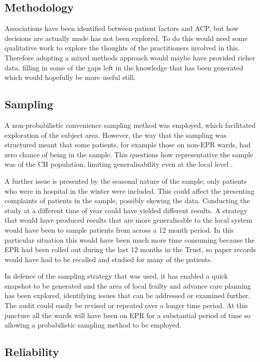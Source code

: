 \documentclass
[
	12pt,
	a4paper,
	oneside,
]{report}
\begin{document}
\subsection{Methodology}

Associations have been identified between patient factors and ACP, but
how decisions are actually made has not been explored. To do this would need 
some qualitative work to explore the thoughts of the practitioners involved
in this. Therefore adopting a mixed methods approach 
would maybe have provided richer data, filling in some of the gaps left in the
knowledge that has been generated which would hopefully be more useful still.

\subsection{Sampling}
A non-probabilistic convenience sampling method was employed, which facilitated 
exploration of the subject area. However, the way that the sampling was 
structured meant that some patients, for example those on non-EPR wards, had
zero chance of being in the sample. This questions how representative the sample
was of the CH population, limiting generalisability even at the local level 
\parencite{biggam:15}.

A further issue is presented by the seasonal 
nature of the sample; only patients who were in hospital in the winter were 
included. This could affect the presenting complaints of patients in the sample,
possibly skewing the data.
Conducting the study at a different time of year could have yielded different 
results. A strategy that would have produced results that are more generalisable
to the local system would have been to sample patients from across
a 12 month period. In this particular situation this would have been much more
time consuming because the EPR had been rolled out during the last 12 months in
the Trust, so paper records would have had to be recalled and studied for many
of the patients. 

In defence of the sampling strategy that was used, it has enabled a quick 
snapshot to be generated and the area of local frailty and advance care planning
has been explored, identifying issues that can be
addressed or examined further. The audit could easily be revised or repeated 
over a longer time period. At this juncture all the wards 
will have been on EPR for a substantial period of time so
allowing a probabilistic sampling method to be employed.

\subsection{Reliability} 
\end{document}
